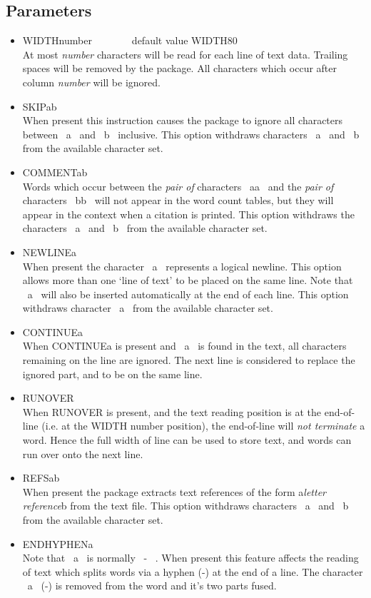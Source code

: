 \subsection{Parameters}
\begin{itemize}
\item WIDTHnumber~~~~~~~~default value  WIDTH80\\
At most {\em number} characters will be read for each line of text data.
Trailing spaces will be removed by the package. All characters which
occur after column {\em number} will be ignored.

\item SKIPab\\
When present this instruction causes the package to ignore all
characters between ~a~ and ~b~ inclusive.  This option withdraws
characters ~a~ and ~b~ from the available character set.

\item COMMENTab\\
Words which occur between the {\em pair of} characters ~aa~ and the {\em pair of}
characters ~bb~ will not appear in the word count tables, but they
will appear in the context when a citation is printed.  This option
withdraws the characters ~a~ and ~b~ from the available character set.

\item NEWLINEa\\
When present the character ~a~ represents a logical newline.  This
option allows more than one `line of text' to be placed on the same
line.  Note that ~a~ will also be inserted automatically at the end of
each line.  This option withdraws character ~a~ from the available
character set.

\item CONTINUEa\\
When CONTINUEa is present and ~a~ is found in the text, all characters
remaining on the line are ignored.  The next line is considered to
replace the ignored part, and to be on the same line.

\item RUNOVER\\
When RUNOVER is present, and the text reading position is at the
end-of-line (i.e. at the WIDTH number position), the end-of-line will
{\em not terminate} a word.  Hence the full width of line can be used to
store text, and words can run over onto the next line.

\item REFSab\\
When present the package extracts text references of the form
a{\em letter reference}b from the text file.  This option withdraws
characters ~a~ and ~b~ from the available character set.

\item ENDHYPHENa\\
Note that ~a~ is normally ~-~ . When present this feature affects the
reading of text which splits words via a hyphen (-) at the end of a line.
The character ~a~ (-) is removed from the word and it's two parts fused.
\end{itemize}

